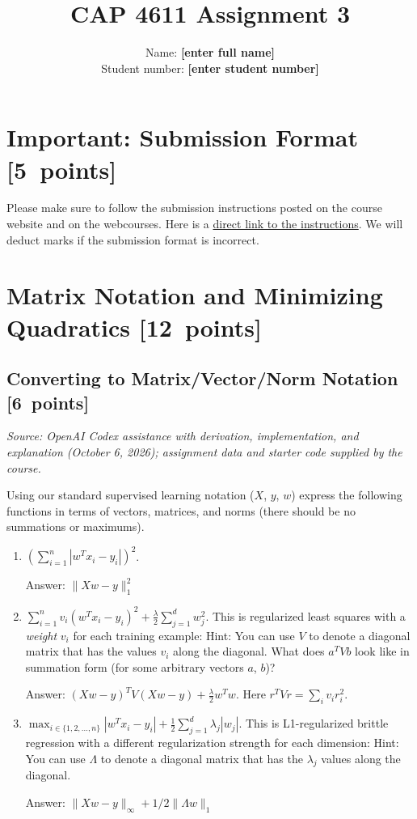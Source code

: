 \documentclass{article}
\newcommand{\blu}[1]{{\textcolor{blu}{#1}}}
\newcommand{\gre}[1]{\textcolor{gre}{#1}}
\newcommand\ans[1]{\par\gre{Answer: #1}}
\let\ask\blu
\newcommand\pts[1]{\textcolor{pointscolour}{[#1~points]}}
\begin{document}
\title{CAP 4611 Assignment 3}
\author{Name: \textbf{[enter full name]}\\Student number: \textbf{[enter student number]}}
\date{}
\maketitle





\section*{Important: Submission Format \pts{5}}

    Please make sure to follow the submission instructions posted on the
    course website and on the webcourses. Here is a \href{https://www.dropbox.com/scl/fi/gpwv8s5b6xx16cepm1bn9/submission_instructions.pdf?rlkey=m3l066bopj9bu1l9m53rbcucs&raw=1}{direct link to the instructions}.
    \ask{We will deduct marks if the submission format is incorrect.}


\section{Matrix Notation and Minimizing Quadratics \pts{12}}

\subsection{Converting to Matrix/Vector/Norm Notation \pts{6}}
\par\textit{Source: OpenAI Codex assistance with derivation, implementation, and explanation (October 6, 2026); assignment data and starter code supplied by the course.}\par


Using our standard supervised learning notation ($X$, $y$, $w$)
\ask{express the following functions in terms of vectors, matrices, and norms} (there should be no summations or maximums).
\begin{enumerate}
\item $\left(\sum_{i=1}^n |w^Tx_i - y_i|\right)^2$.
\ans{$\lVert Xw - y\rVert_1^2$}
\item $\sum_{i=1}^n v_i(w^Tx_i  - y_i)^2 + \frac{\lambda}{2}\sum_{j=1}^d w_j^2$. This is regularized least squares with a \emph{weight} $v_i$ for each training example:  Hint: You can use $V$ to denote a diagonal matrix that has the values $v_i$ along the diagonal. What does $a^T V b$ look like in summation form (for some arbitrary vectors $a$, $b$)?
\ans{$(Xw-y)^T V(Xw-y)+\frac{\lambda}{2}w^Tw$. Here $r^TVr=\sum_i v_i r_i^2$.}
\item $\max_{i \in \{1,2,\dots,n\}}  |w^Tx_i - y_i| +  \frac12 \sum_{j=1}^{d} \lambda_j|w_j|$. This is L1-regularized brittle regression with a different regularization strength for each dimension: Hint: You can use  $\Lambda$ to denote a diagonal matrix that has the $\lambda_j$ values along the diagonal.
\ans{$\lVert Xw-y\rVert_\infty + 1/2\lVert \Lambda w\rVert_1$}
\end{enumerate}
\end{document}
